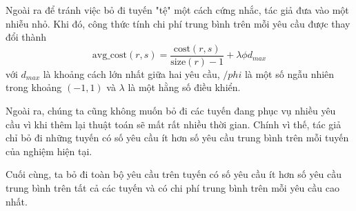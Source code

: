 Ngoài ra để tránh việc bỏ đi tuyến "tệ" một cách cứng nhắc, tác giả đưa vào một nhiễu nhỏ. Khi đó, công thức tính chi phí trung bình trên mỗi yêu cầu được thay đổi thành
\begin{equation}
	\label{eq:destroy_route}
	\text{avg\_cost}(r, s) = \frac{\text{cost}(r, s)}{\text{size}(r)-1} + \lambda \phi d_{max}
\end{equation}
với $d_{max}$ là khoảng cách lớn nhất giữa hai yêu cầu, $/phi$ là một số ngẫu nhiên trong khoảng $(-1,1)$ và $\lambda$ là một hằng số điều khiển.

Ngoài ra, chúng ta cũng không muốn bỏ đi các tuyến đang phục vụ nhiều yêu cầu vì khi thêm lại thuật toán sẽ mất rất nhiều thời gian. Chính vì thế, tác giả chỉ bỏ đi những tuyến có số yêu cầu ít hơn số yêu cầu trung bình trên mỗi tuyến của nghiệm hiện tại.

Cuối cùng, ta bỏ đi toàn bộ yêu cầu trên tuyến có số yêu cầu ít hơn số yêu cầu trung bình trên tất cả các tuyến và có chi phí trung bình trên mỗi yêu cầu cao nhất.